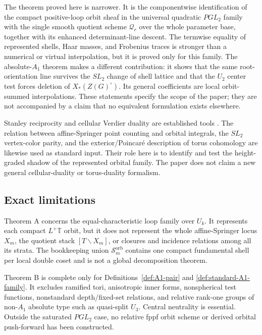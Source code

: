 \documentclass[11pt]{article}
\theoremstyle{definition}
\theoremstyle{remark}
\newcommand{\Uk}{U_k}
\begin{document}
The theorem proved here is narrower.  It is the componentwise identification
of the compact positive-loop orbit sheaf in the universal quadratic $PGL_2$
family with the single smooth quotient scheme $\mathscr Q_r$ over the whole
parameter base, together with its enhanced determinant-line descent.  The
termwise equality of represented shells, Haar masses, and Frobenius traces is
stronger than a numerical or virtual interpolation, but it is proved only for
this family.  The absolute-$A_1$ theorem makes a different contribution: it
shows that the same root-orientation line survives the $SL_2$ change of shell
lattice and that the $U_2$ center test forces deletion of
$X_*(Z(G)^\circ)$.  Its general coefficients are local orbit-summed
interpolations.  These statements specify the scope of the paper; they are
not accompanied by a claim that no equivalent formulation exists elsewhere.

Stanley reciprocity and cellular Verdier duality are established tools
\cite{Stanley,Curry,BresslerLunts}.  The relation between affine-Springer
point counting and orbital integrals, the $SL_2$ vertex-color parity, and the
exterior/Poincar\'e description of torus cohomology are likewise used as
standard input.  Their role here is to identify and test the height-graded
shadow of the represented orbital family.  The paper does not claim a new
general cellular-duality or torus-duality formalism.

\subsection{Exact limitations}

Theorem A concerns the equal-characteristic loop family over $\Uk$.  It
represents each compact $L^+\mathbb T$ orbit, but it does not represent the
whole affine-Springer locus $X_m$, the quotient stack $[T\backslash X_m]$, or
closures and incidence relations among all its strata.  The bookkeeping
union $\mathscr S_m^{\mathrm{orb}}$ contains one compact fundamental shell per
local double coset and is not a global decomposition theorem.

Theorem B is complete only for Definitions~\ref{def:A1-pair} and
\ref{def:standard-A1-family}.  It excludes ramified tori, anisotropic inner
forms, nonspherical test functions, nonstandard depth/fixed-set relations,
and relative rank-one groups of non-$A_1$ absolute type such as quasi-split
$U_3$.  Central neutrality is essential.  Outside the saturated $PGL_2$
case, no relative fppf orbit scheme or derived orbital push-forward has been
constructed.
\end{document}
